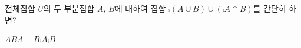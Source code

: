 전체집합 $U$의 두 부분집합 $A$, $B$에 대하여 집합 $\comp{(A\cup B)}\cup(\comp{A}\cap B)$를 간단히 하면?
\begin{choices32}{$A$}{$B$}{$A-B$}{$\comp{A}$}{$\comp{B}$}\end{choices32}
